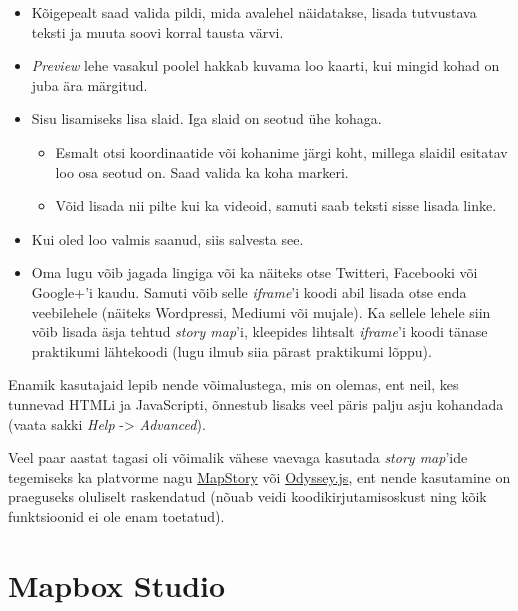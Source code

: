 \documentclass[
]{book}
\providecommand{\tightlist}{%
  \setlength{\itemsep}{0pt}\setlength{\parskip}{0pt}}
\begin{document}
\begin{itemize}
\tightlist
\item
  Kõigepealt saad valida pildi, mida avalehel näidatakse, lisada tutvustava teksti ja muuta soovi korral tausta värvi.\\
\item
  \emph{Preview} lehe vasakul poolel hakkab kuvama loo kaarti, kui mingid kohad on juba ära märgitud.\\
\item
  Sisu lisamiseks lisa slaid. Iga slaid on seotud ühe kohaga.

  \begin{itemize}
  \tightlist
  \item
    Esmalt otsi koordinaatide või kohanime järgi koht, millega slaidil esitatav loo osa seotud on. Saad valida ka koha markeri.\\
  \item
    Võid lisada nii pilte kui ka videoid, samuti saab teksti sisse lisada linke.\\
  \end{itemize}
\item
  Kui oled loo valmis saanud, siis salvesta see.\\
\item
  Oma lugu võib jagada lingiga või ka näiteks otse Twitteri, Facebooki või Google+'i kaudu. Samuti võib selle \emph{iframe}'i koodi abil lisada otse enda veebilehele (näiteks Wordpressi, Mediumi või mujale). Ka sellele lehele siin võib lisada äsja tehtud \emph{story map}'i, kleepides lihtsalt \emph{iframe}'i koodi tänase praktikumi lähtekoodi (lugu ilmub siia pärast praktikumi lõppu).
\end{itemize}

Enamik kasutajaid lepib nende võimalustega, mis on olemas, ent neil, kes tunnevad HTMLi ja JavaScripti, õnnestub lisaks veel päris palju asju kohandada (vaata sakki \emph{Help} -\textgreater{} \emph{Advanced}).

Veel paar aastat tagasi oli võimalik vähese vaevaga kasutada \emph{story map}'ide tegemiseks ka platvorme nagu \href{https://mapstory.org}{MapStory} või \href{https://cartodb.github.io/odyssey.js/}{Odyssey.js}, ent nende kasutamine on praeguseks oluliselt raskendatud (nõuab veidi koodikirjutamisoskust ning kõik funktsioonid ei ole enam toetatud).

\hypertarget{mapbox-studio}{%
\section{Mapbox Studio}\label{mapbox-studio}}
\end{document}
